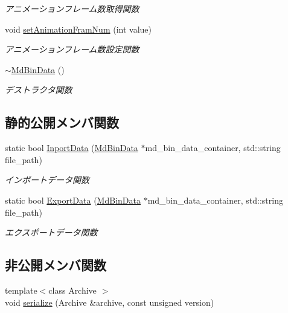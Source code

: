 \begin{DoxyCompactItemize}
\begin{DoxyCompactList}\small\item\em アニメーションフレーム数取得関数 \end{DoxyCompactList}\item 
void \mbox{\hyperlink{class_md_bin_data_a656893994f5197194cae842918090f59}{set\+Animation\+Fram\+Num}} (int value)
\begin{DoxyCompactList}\small\item\em アニメーションフレーム数設定関数 \end{DoxyCompactList}\item 
\mbox{\hyperlink{class_md_bin_data_a8a2fe0ddd94c58c37e513f19b94c044f}{$\sim$\+Md\+Bin\+Data}} ()
\begin{DoxyCompactList}\small\item\em デストラクタ関数 \end{DoxyCompactList}\end{DoxyCompactItemize}
\subsection*{静的公開メンバ関数}
\begin{DoxyCompactItemize}
\item 
static bool \mbox{\hyperlink{class_md_bin_data_a75fdc719dd711d95d3cd7519132a2ba4}{Inport\+Data}} (\mbox{\hyperlink{class_md_bin_data}{Md\+Bin\+Data}} $\ast$md\+\_\+bin\+\_\+data\+\_\+container, std\+::string file\+\_\+path)
\begin{DoxyCompactList}\small\item\em インポートデータ関数 \end{DoxyCompactList}\item 
static bool \mbox{\hyperlink{class_md_bin_data_aa9e3d4f176e966533640206296a222cd}{Export\+Data}} (\mbox{\hyperlink{class_md_bin_data}{Md\+Bin\+Data}} $\ast$md\+\_\+bin\+\_\+data\+\_\+container, std\+::string file\+\_\+path)
\begin{DoxyCompactList}\small\item\em エクスポートデータ関数 \end{DoxyCompactList}\end{DoxyCompactItemize}
\subsection*{非公開メンバ関数}
\begin{DoxyCompactItemize}
\item 
{\footnotesize template$<$class Archive $>$ }\\void \mbox{\hyperlink{class_md_bin_data_a3311ed96bf9545d30a9b08c6649078a9}{serialize}} (Archive \&archive, const unsigned version)
\end{DoxyCompactItemize}
